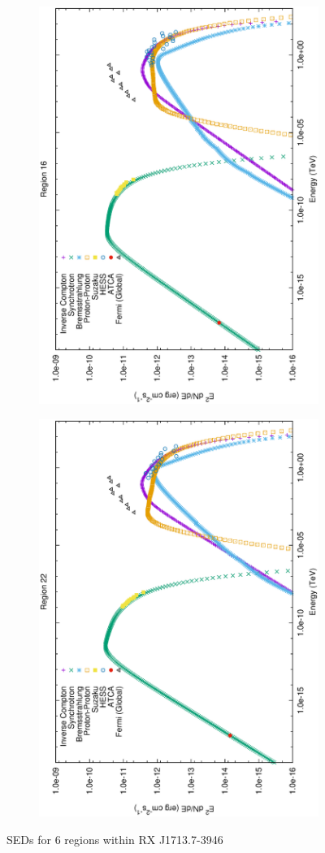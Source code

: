 \documentclass[12pt,a4paper]{article}
\begin{document}
\begin{figure}[H]
\begin{subfigure}{0.5\textwidth}
		\label{fig:rxj1713lephad15}
	\end{subfigure}
	\begin{subfigure}{0.5\textwidth}
		\centering
		\includegraphics[width=0.7\linewidth, height=0.27\textheight, angle=-90]{rxj1713_lephad16}
		\label{fig:rxj1713lephad16}
	\end{subfigure}
	\begin{subfigure}{0.5\textwidth}
		\centering
		\includegraphics[width=0.7\linewidth, height=0.27\textheight, angle=-90]{rxj1713_lephad22}
		\label{fig:rxj1713lephad22}
	\end{subfigure}
	\caption{SEDs for 6 regions within RX J1713.7-3946}
	\label{fig:regionalseds}
\end{figure}
\end{document}
